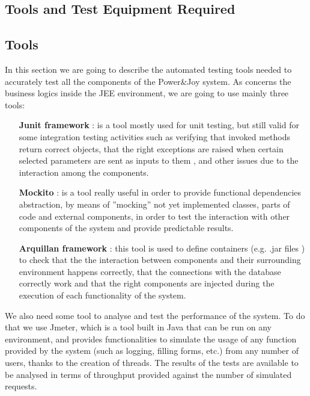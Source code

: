 \documentclass{article}
\begin{document}
\begin{flushleft}
   
   
   

  
  
  \section{Tools and Test Equipment Required } 		%
  
  
  
  \subsection{Tools}
 
  In this section we are going to describe the automated testing tools needed to accurately test all the components of the Power\&Joy system. 
 As concerns the business logics inside the JEE environment, we are going to use mainly three tools:
 \begin{itemize}
 
 \item[\textbf{Junit framework}]: is a tool mostly used for unit testing, but still valid for some integration testing activities such as verifying that invoked methods return correct objects, that the right exceptions are raised when certain selected parameters are sent as inputs to them , and other issues due to the interaction among the components.
 \item [\textbf{Mockito}]: is a tool really useful in order to provide functional  dependencies abstraction, by means of ''mocking'' not yet implemented classes, parts of code and external components, in order to test the interaction with other components of the system and provide predictable results.
 \item [\textbf{Arquillan framework}]: this tool is used to define containers (e.g. .jar files ) to check that the the interaction between components and their surrounding environment happens correctly, that the connections with the database correctly work and that the right components are injected during the execution of each functionality of the system.
  \end{itemize}
  
  We also need some tool to analyse and test the performance of the system. To do that we use Jmeter, which is a tool built in Java that can be run on any environment, and provides functionalities to simulate the usage of any function provided by the system (such as logging, filling forms, etc.) from any number of users, thanks to the creation of threads. The results of the tests are available to be analysed in terms of throughput provided against the number of simulated requests.     
  

\end{flushleft}
\end{document}

